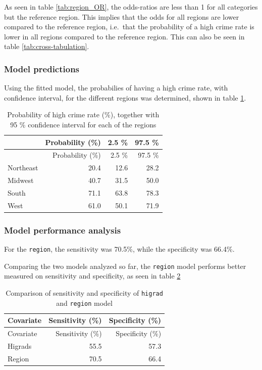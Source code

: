 \documentclass[a4paper]{article}
\begin{document}
As seen in table \ref{tab:region_OR}, the odds-ratios are less than 1
for all categories but the reference region. This implies that the odds
for all regions are lower compared to the reference region, i.e.~that
the probability of a high crime rate is lower in all regions compared to
the reference region. This can also be seen in table
\ref{tab:cross-tabulation}.

\hypertarget{model-predictions-1}{%
\subsubsection{Model predictions}\label{model-predictions-1}}

Using the fitted model, the probabilies of having a high crime rate,
with confidence interval, for the different regions was determined,
shown in table \ref{tab:region_prob}.

\begin{longtable}[]{@{}lrrr@{}}
\caption{\label{tab:region_prob}Probability of high crime rate (\%),
together with 95 \% confidence interval for each of the
regions}\tabularnewline
\toprule
& Probability (\%) & 2.5 \% & 97.5 \%\tabularnewline
\midrule
\endfirsthead
\toprule
& Probability (\%) & 2.5 \% & 97.5 \%\tabularnewline
\midrule
\endhead
Northeast & 20.4 & 12.6 & 28.2\tabularnewline
Midwest & 40.7 & 31.5 & 50.0\tabularnewline
South & 71.1 & 63.8 & 78.3\tabularnewline
West & 61.0 & 50.1 & 71.9\tabularnewline
\bottomrule
\end{longtable}

\hypertarget{model-performance-analysis-1}{%
\subsubsection{Model performance
analysis}\label{model-performance-analysis-1}}

For the \texttt{region}, the sensitivity was 70.5\%, while the
specificity was 66.4\%.

Comparing the two models analyzed so far, the \texttt{region} model
performs better measured on sensitivity and specificity, as seen in
table \ref{tab:compare_sense_spec_region_higrad}

\begin{longtable}[]{@{}lrr@{}}
\caption{\label{tab:compare_sense_spec_region_higrad}Comparison of
sensitivity and specificity of \texttt{higrad} and \texttt{region}
model}\tabularnewline
\toprule
Covariate & Sensitivity (\%) & Specificity (\%)\tabularnewline
\midrule
\endfirsthead
\toprule
Covariate & Sensitivity (\%) & Specificity (\%)\tabularnewline
\midrule
\endhead
Higrads & 55.5 & 57.3\tabularnewline
Region & 70.5 & 66.4\tabularnewline
\bottomrule
\end{longtable}
\end{document}

